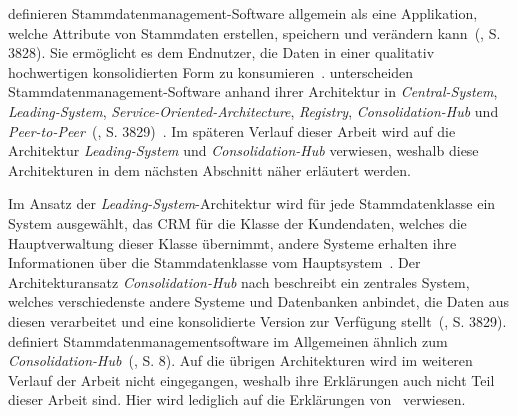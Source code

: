 \documentclass[
  language=german, %
  type=bachelor,%
  ngerman
]{isthesis}
\begin{document}
\begin{content}
  \textsc{\citeauthor{baghi2014toward}} definieren
  Stammdatenmanagement-Software allgemein als eine Applikation, welche
  Attribute von Stammdaten erstellen, speichern und verändern
  kann~(\citeyear{baghi2014toward}, S. 3828).  Sie ermöglicht es dem Endnutzer, die Daten in einer
  qualitativ hochwertigen konsolidierten Form zu konsumieren~\cite[][Abschnitt
  1.2.]{dreibelbis2008enterprise}.  \textsc{\citeauthor{baghi2014toward}}
  unterscheiden Stammdatenmanagement-Software anhand ihrer Architektur in
  \textit{Central-System}, \textit{Leading-System},
  \textit{Service-Oriented-Architecture}, \textit{Registry},
  \textit{Consolidation-Hub} und
  \textit{Peer-to-Peer}~(\citeyear{baghi2014toward}, S. 3829)~\cite[][Abschnitt
  5.3.1.]{dreibelbis2008enterprise}. Im späteren Verlauf dieser Arbeit wird auf
  die Architektur \textit{Leading-System} und \textit{Consolidation-Hub}
  verwiesen, weshalb diese Architekturen in dem nächsten Abschnitt näher
  erläutert werden.

  Im Ansatz der \textit{Leading-System}-Architektur wird für jede
  Stammdatenklasse ein System ausgewählt, \zB{} das \acrshort{CRM} für die
  Klasse der Kundendaten, welches die Hauptverwaltung dieser Klasse übernimmt,
  andere Systeme erhalten ihre Informationen über die Stammdatenklasse vom
  Hauptsystem~\cite[][S. 3829]{baghi2014toward}. Der Architekturansatz
  \textit{Consolidation-Hub} nach \textsc{\citeauthor{baghi2014toward}}
  beschreibt ein zentrales System, welches verschiedenste andere Systeme und
  Datenbanken anbindet, die Daten aus diesen verarbeitet und eine konsolidierte
  Version zur Verfügung stellt~(\citeyear{baghi2014toward}, S. 3829).
  \textsc{\citeauthor{loshin2010master}} definiert Stammdatenmanagementsoftware
  im Allgemeinen ähnlich zum
  \textit{Consolidation-Hub}~(\citeyear{loshin2010master}, S. 8). Auf die
  übrigen Architekturen wird im weiteren Verlauf der Arbeit nicht eingegangen,
  weshalb ihre Erklärungen auch nicht Teil dieser Arbeit sind. Hier wird
  lediglich auf die Erklärungen von~\textsc{\citeauthor{baghi2014toward}}
  \citeyearpar{baghi2014toward} verwiesen.


\end{content}
\end{document}
